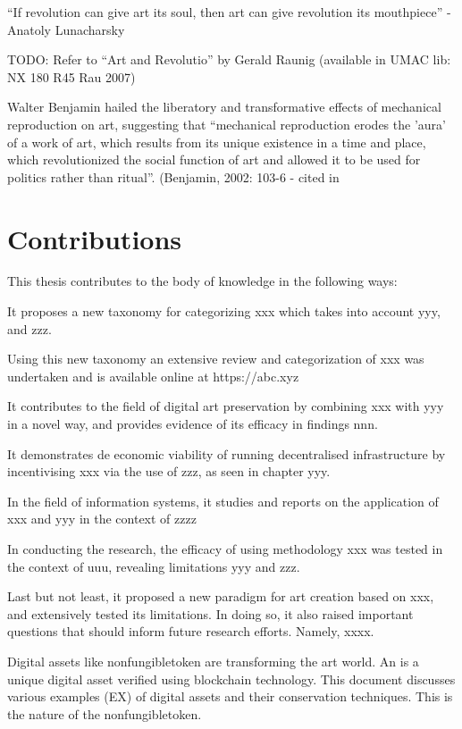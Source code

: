 ``If revolution can give art its soul, then art can give revolution its mouthpiece'' - Anatoly Lunacharsky

TODO: Refer to ``Art and Revolutio'' by Gerald Raunig (available in UMAC lib: NX 180 R45 Rau 2007)

Walter Benjamin hailed the liberatory and transformative effects of mechanical reproduction on art, suggesting that ``mechanical reproduction erodes the 'aura' of a work of art, which results from its unique existence in a time and place, which revolutionized the social function of art and allowed it to be used for politics rather than ritual''. (Benjamin, 2002: 103-6 - cited in \cite[p.3]{gereArtTimeTechnology2006}

\section{Contributions}

This thesis contributes to the body of knowledge in the following ways:

It proposes a new taxonomy for categorizing xxx which takes into account yyy, and zzz.

Using this new taxonomy an extensive review and categorization of xxx was undertaken and is available online at https://abc.xyz

It contributes to the field of digital art preservation by combining xxx with yyy in a novel way, and provides evidence of its efficacy in findings nnn.

It demonstrates de economic viability of running decentralised infrastructure by incentivising xxx via the use of zzz, as seen in chapter yyy.

In the field of information systems, it studies and reports on the application of xxx and yyy in the context of zzzz

In conducting the research, the efficacy of using methodology xxx was tested in the context of uuu, revealing limitations yyy and zzz.

Last but not least, it proposed a new paradigm for art creation based on xxx, and extensively tested its limitations. In doing so, it also raised important questions that should inform future research efforts. Namely, xxxx.

Digital assets like \gls{nonfungibletoken} are transforming the art world. An  is a unique digital asset verified using blockchain technology.
This document discusses various examples (EX) of digital assets and their conservation techniques. This is the nature of the \gls{nonfungibletoken}.



